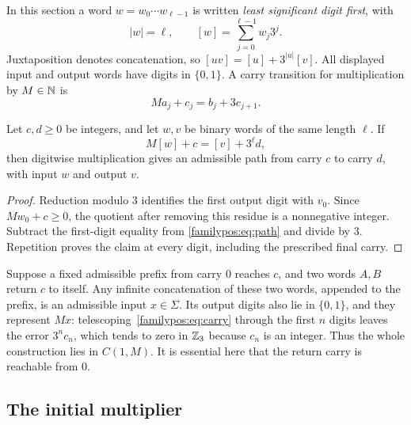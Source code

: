 In this section a word $w=w_0\cdots w_{\ell-1}$ is written
\emph{least significant digit first}, with
\[
 |w|=\ell,\qquad [w]=\sum_{j=0}^{\ell-1}w_j3^j.
\]
Juxtaposition denotes concatenation, so $[uv]=[u]+3^{|u|}[v]$.
All displayed input and output words have digits in $\{0,1\}$.
A carry transition for multiplication by $M\in\mathbb N$ is
\begin{equation}\label{familypos:eq:carry}
             Ma_j+c_j=b_j+3c_{j+1}.
\end{equation}

\begin{lemma}
\label{familypos:lem:path}
Let $c,d\ge0$ be integers, and let $w,v$ be binary words of
the same length $\ell$. If
\begin{equation}\label{familypos:eq:path}
                 M[w]+c=[v]+3^\ell d,
\end{equation}
then digitwise multiplication gives an admissible path from carry
$c$ to carry $d$, with input $w$ and output $v$.
\end{lemma}

\begin{proof}
Reduction modulo $3$ identifies the first output digit with $v_0$.
Since $Mw_0+c\ge0$, the quotient after removing this residue is a
nonnegative integer. Subtract the first-digit equality from
\eqref{familypos:eq:path} and divide by $3$. Repetition proves the
claim at every digit, including the prescribed final carry.
\end{proof}

Suppose a fixed admissible prefix from carry $0$ reaches $c$, and
two words $A,B$ return $c$ to itself. Any infinite concatenation of
these two words, appended to the prefix, is an admissible input
$x\in\Sigma$. Its output digits also lie in $\{0,1\}$, and they
represent $Mx$: telescoping~\eqref{familypos:eq:carry} through the
first $n$ digits leaves the error $3^nc_n$, which tends to zero in
$\mathbb Z_3$ because $c_n$ is an integer. Thus the whole construction
lies in $C(1,M)$. It is essential here that the return carry is
reachable from $0$.

\subsection{The initial multiplier}

